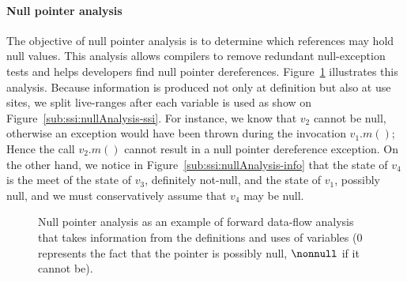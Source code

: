 {\paragraph{Null pointer analysis} The objective of null pointer 
analysis is to 
determine which references may hold null values.
This analysis allows compilers to remove redundant null-exception tests and 
helps developers find null pointer dereferences.
Figure~\ref{fig:ssi:nullAnalysis} illustrates this analysis.
Because information is produced not only at definition but also at use sites, 
we split live-ranges after each variable is used as show on Figure~\ref{sub:ssi:nullAnalysis-ssi}.
For instance, we know that $v_2$ cannot be null, otherwise an exception would 
have been thrown during the invocation $v_1.m()$;
Hence the call $v_2.m()$ cannot result in a null pointer dereference exception.
On the other hand, we notice in Figure~\ref{sub:ssi:nullAnalysis-info} that the 
state of $v_4$ is the meet of the state of $v_3$, definitely not-null, and the 
state of $v_1$, possibly null, and we must conservatively assume that $v_4$ may 
be null.


\begin{figure}[t!]
  \subfloat[]{
    \label{sub:ssi:nullAnalysis-cfg}
    \useheightbox
  }
  \hfill
  \hfill
\caption{Null pointer analysis as an example of forward data-flow analysis that takes information from the definitions and uses of variables ($0$ represents the fact that the pointer is possibly null, $\nonnull$ if it cannot be).}
\label{fig:ssi:nullAnalysis}
\end{figure}

}
